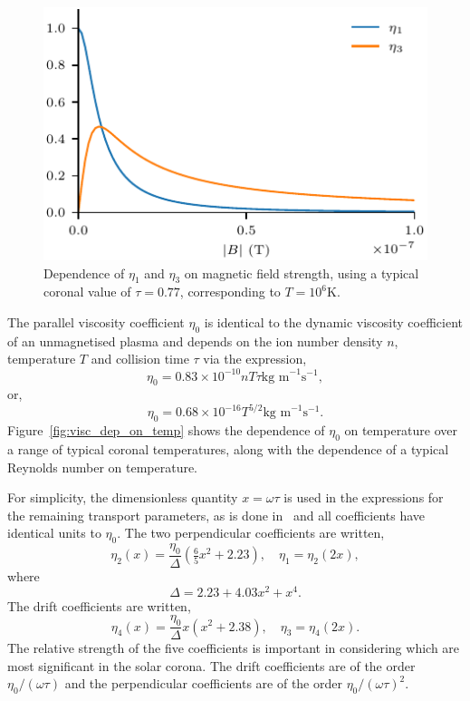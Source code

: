 \begin{figure}[t]
  \centering
  \includegraphics[width=0.5\linewidth]{brag_coeffs.pdf}
  \caption{Dependence of $\eta_1$ and $\eta_3$ on magnetic field strength, using a typical coronal value of $\tau = 0.77$, corresponding to $T=10^6$K.}
\label{fig:visc_dep}%
\end{figure}

The parallel viscosity coefficient $\eta_0$ is identical to the dynamic viscosity coefficient of an unmagnetised plasma and depends on the ion number density $n$, temperature $T$ and collision time $\tau$ via the expression,
\begin{equation}
  \label{eq:parallel_visc_coeff}
  \eta_0 = 0.83 \times 10^{-10} n T \tau \text{kg m}^{-1}\text{s}^{-1},
\end{equation}
or,
\begin{equation}
  \label{eq:parallel_visc_coeff2}
  \eta_0 = 0.68 \times 10^{-16} T^{5/2} \text{kg m}^{-1}\text{s}^{-1}.
\end{equation}
Figure~\ref{fig:visc_dep_on_temp} shows the dependence of $\eta_0$ on temperature over a range of typical coronal temperatures, along with the dependence of a typical Reynolds number on temperature. 

For simplicity, the dimensionless quantity $x = \omega \tau$ is used in the expressions for the remaining transport parameters, as is done in~\cite{braginskiiTransportProcessesPlasma1965} and all coefficients have identical units to $\eta_0$. The two perpendicular coefficients are written,
\begin{equation}
  \label{eq:perp_visc_coeff}
  \eta_2(x) = \frac{\eta_0}{\Delta} \left( \tfrac{6}{5} x^2 + 2.23 \right), \quad \eta_1 = \eta_2(2x),
\end{equation}
where
\begin{equation}
  \label{eq:delta}
\Delta = 2.23 + 4.03x^2 + x^4.
\end{equation}
The drift coefficients are written,
\begin{equation}
  \label{eq:drift_visc_coeff}
  \eta_4(x) = \frac{\eta_0}{\Delta} x \left( x^2 + 2.38 \right), \quad \eta_3 = \eta_4(2x).
\end{equation}
The relative strength of the five coefficients is important in considering which are most significant in the solar corona. The drift coefficients are of the order $\eta_0/(\omega \tau)$ and the perpendicular coefficients are of the order $\eta_0/(\omega \tau)^2$.

